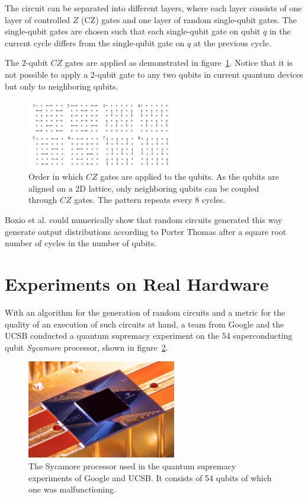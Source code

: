 The circuit can be separated into different layers, where each layer consists of one
layer of controlled $Z$ (CZ) gates and one layer of random single-qubit gates. The single-qubit
gates are chosen such that each single-qubit gate on qubit $q$ in the current
cycle differs from the single-qubit gate on $q$ at the previous cycle.

The 2-qubit $CZ$ gates are applied as demonstrated in figure~\ref{fig:czgates}.
Notice that it is not possible to apply a 2-qubit gate to any two qubits in
current quantum devices but only to neighboring qubits.

\begin{figure}[H]
  \centering
  \label{fig:czgates}
  \includegraphics[width=0.58\textwidth]{figures/cz_order}
  \caption[Order of $CZ$ gate applications]{Order in which $CZ$ gates are applied to the qubits. As 
  the qubits are aligned on a 2D lattice, only neighboring qubits can be coupled through $CZ$ gates. 
  The pattern repeats every 8 cycles.}
\end{figure}

Boxio et al. could numerically show that random circuits generated this way
generate output distributions according to Porter Thomas after a square root
number of cycles in the number of qubits.

\section{Experiments on Real Hardware}

With an algorithm for the generation of random circuits and a metric for the
quality of an execution of such circuits at hand, a team from Google and the UCSB conducted a quantum
supremacy experiment on the 54 superconducting qubit \textit{Sycamore}
processor, shown in figure~\ref{fig:sycamore}.

\begin{figure}[H]
  \centering
  \label{fig:sycamore}
  \includegraphics[width=0.58\textwidth]{figures/sycamore}
  \caption[The Sycamore processor]{The Sycamore processor used in the quantum supremacy experiments of Google and UCSB. It consists of 54 qubits of which one was malfunctioning.}
\end{figure}

